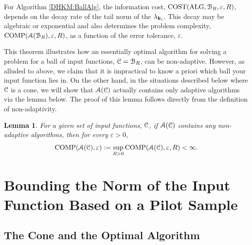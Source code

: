 \documentclass[USenglish]{article}
\theoremstyle{dgthm}
\theoremstyle{dgthm}
\newtheorem{lemma}[theorem]{Lemma}
\theoremstyle{dgthm}
\theoremstyle{dgthm}
\theoremstyle{dgdef}
\theoremstyle{definition}
\DeclareMathOperator{\ALG}{ALG}
\DeclareMathOperator{\COST}{COST}
\DeclareMathOperator{\COMP}{COMP}
\begin{document}
{For Algorithm \ref{DHKM:BallAlg}, the information cost, $\COST(\ALG,\calB_R,\varepsilon, R)$, depends on the decay rate of the tail norm of the $\lambda_{{\boldsymbol{k}}_i}$.  This decay may be algebraic or exponential and also determines the problem complexity, $\COMP(\calA(\calB_R),\varepsilon, R)$, as a function of the error tolerance, $\varepsilon$.  


This theorem illustrates how an essentially optimal algorithm for solving a problem for a ball of input functions, ${\mathcal{C}} = {\mathcal{B}}_R$, can be non-adaptive.  However, as alluded to above, we claim that it is impractical to know a priori which ball your input function lies in.  On the other hand, in the situations described below where ${\mathcal{C}}$ is a cone, we will show that ${\mathcal{A}}({\mathcal{C}})$ actually contains only adaptive algorithms via the lemma below.  The proof of this lemma follows directly from the definition of non-adaptivity.

\begin{lemma} \label{DHKM:NoNonAdpatLem}
For a given set of input functions, ${\mathcal{C}}$, if  ${\mathcal{A}}({\mathcal{C}})$ contains any non-adaptive algorithms, then for every $\varepsilon > 0$,
\begin{equation*}
    \COMP(\calA(\calC),\varepsilon) : = \sup_{R > 0} \COMP(\calA(\calC),\varepsilon, R) < \infty.
\end{equation*}
\end{lemma}
}






\section{Bounding the Norm of the Input Function Based on a Pilot Sample} 
\label{DHKM:pilot_sec} 


\subsection{The Cone and the Optimal Algorithm}
\end{document}
